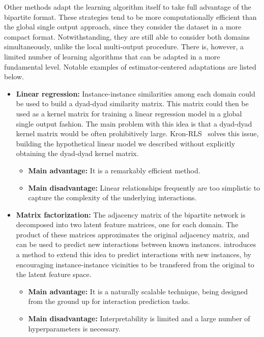 Other methods adapt the learning algorithm itself to take full advantage of the bipartite format. These strategies tend to be more computationally efficient than the global single output approach, since they consider the dataset in a more compact format. Notwithstanding, they are still able to consider both domains simultaneously, unlike the local multi-output procedure. There is, however, a limited number of learning algorithms that can be adapted in a more fundamental level. Notable examples of estimator-centered adaptations are listed below.

\begin{itemize}
    \item \textbf{Linear regression:} Instance-instance similarities among each domain could be used to build a dyad-dyad similarity matrix. This matrix could then be used as a kernel matrix for training a linear regression model in a global single output fashion. The main problem with this idea is that a dyad-dyad kernel matrix would be often prohibitively large. Kron-RLS~\cite{vanlaarhoven2011gaussian} solves this issue, building the hypothetical linear model we described without explicitly obtaining the dyad-dyad kernel matrix.
    \begin{itemize}
        \item \textbf{Main advantage:} It is a remarkably efficient method.
        \item \textbf{Main disadvantage:} Linear relationships frequently are too simplistic to capture the complexity of the underlying interactions.
    \end{itemize}
    \item \textbf{Matrix factorization:} The adjacency matrix of the bipartite network is decomposed into two latent feature matrices, one for each domain. The product of these matrices approximates the original adjacency matrix, and can be used to predict new interactions between known instances.  introduces a method to extend this idea to predict interactions with new instances, by encouraging instance-instance vicinities to be transfered from the original to the latent feature space.
    \begin{itemize}
        \item \textbf{Main advantage:} It is a naturally scalable technique, being designed from the ground up for interaction prediction tasks.
        \item \textbf{Main disadvantage:} Interpretability is limited and a large number of hyperparameters is necessary.  %

\end{itemize}
\end{itemize}
